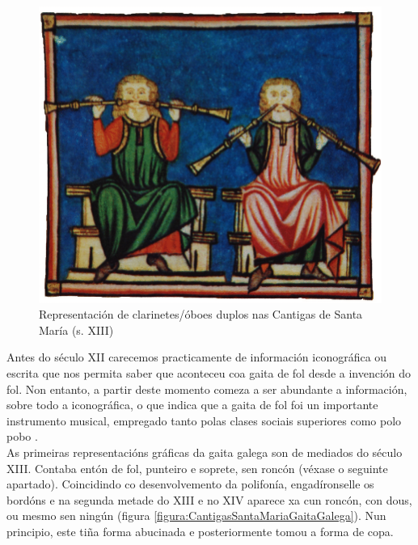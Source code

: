  \begin{figure}[htbp]
  \centering
  \includegraphics[scale=0.2,keepaspectratio=true]{./imagenes/cantigas-santa-maria-clarinetes-oboes-duplos.png}
  \caption[Clarinetes/óboes duplos nas Cantigas de Santa María]{Representación de clarinetes/óboes duplos nas Cantigas de Santa María (s. XIII) \cite{CantigasSantaMariaClarinetesOboesDuplos}}
  \label{figura:CantigasSantaMariaClarinetesOboesDuplos}
 \end{figure}

 Antes do século XII carecemos practicamente de información iconográfica ou
 escrita que nos permita saber que aconteceu coa gaita de fol desde a invención
 do fol. Non entanto, a partir deste momento comeza a ser abundante a
 información, sobre todo a iconográfica, o que indica que a gaita de fol foi un
 importante instrumento musical, empregado tanto polas clases sociais
 superiores como polo pobo \cite{AGGGaitaGalega}. \\

 As primeiras representacións gráficas da gaita galega son de mediados do
 século XIII. Contaba entón de fol, punteiro e soprete, sen roncón (véxase o
 seguinte apartado). Coincidindo co desenvolvemento da polifonía,
 engadíronselle os bordóns e na segunda metade do XIII e no XIV aparece xa cun
 roncón, con dous, ou mesmo sen ningún (figura
 \ref{figura:CantigasSantaMariaGaitaGalega}). Nun principio, este tiña forma
 abucinada e posteriormente tomou a forma de copa.

